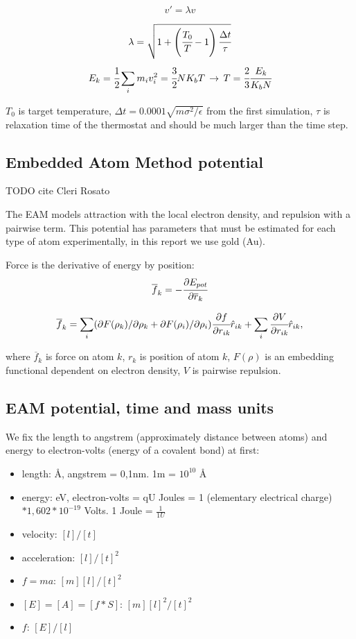 \documentclass[12pt,a4paper]{article}
\newcommand{\infers}{\,\to\,}
\newcommand{\mat}[1]{\overline{#1}}
\begin{document}
\[ v' = \lambda v \]

\[ \lambda = \sqrt{1 + \left(\cfrac{T_0}{T}-1 \right) \cfrac{\Delta t}{\tau} }  \]
\[ E_k = \cfrac{1}{2} \sum_i m_i v_i^2 = \cfrac{3}{2} N K_b T \infers T = \cfrac{2}{3} \cfrac{E_k}{K_b N} \]

\(T_0\) is target temperature, \(\Delta t = 0.0001 \sqrt{m\sigma^2 / \epsilon} \) from the first simulation, \( \tau \) is relaxation time of the thermostat and should be much larger than the time step.

\subsection*{Embedded Atom Method potential}

TODO cite Cleri Rosato

The EAM models attraction with the local electron density, and repulsion with a pairwise term. This potential has parameters that must be estimated for each type of atom experimentally, in this report we use gold (Au).

Force is the derivative of energy by position:
\[
\mat{f}_k = -\cfrac{\partial E_{pot}}{\partial \mat{r}_k}
\]

\[
\mat{f}_k = \sum_i ( \partial F(\rho_k) / \partial \rho_k + \partial F(\rho_i) / \partial \rho_i )  \cfrac{\partial f}{\partial r_{ik}} \hat{r}_{ik} +
\sum_i \cfrac{\partial V}{\partial r_{ik}} \hat{r}_{ik},
\]

where $\mat{f}_k$ is force on atom $k$, $r_k$ is position of atom $k$, $F(\rho)$ is an embedding functional dependent on electron density, $V$ is pairwise repulsion.

\subsection*{EAM potential, time and mass units}

We fix the length to angstrem (approximately distance between atoms) and energy to electron-volts (energy of a covalent bond) at first:

\begin{itemize}
	\item length: Å, angstrem = 0,1nm. 1m = $10^{10}$ Å
	\item energy: eV, electron-volts = qU Joules = 1 (elementary electrical charge) $* 1,602 * 10^{-19}$ Volts. 1 Joule = $\frac{1}{1U}$
	\item velocity: $[l]/[t]$
	\item acceleration: $[l]/[t]^2$
	\item $f=ma$:       $[m][l]/[t]^2$
	\item $[E]=[A]=[f*S]$:    $[m][l]^2/[t]^2$
	\item $f$: $[E]/[l]$
\end{itemize}
\end{document}
